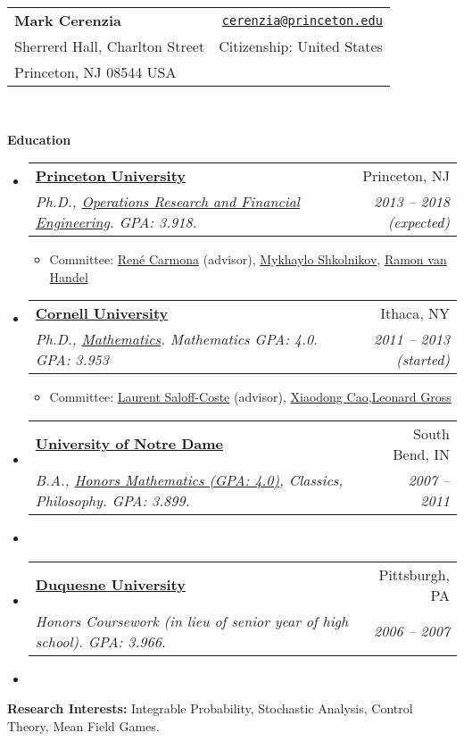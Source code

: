 \documentclass[letterpaper,11pt]{article}
\makeatletter
\newcommand{\resitem}[1]{\item #1 \vspace{-2pt}}
\newcommand{\resheading}[1]{{\large {\textbf{#1 \vphantom{p\^{E}}}}}}
\newenvironment{widetable}[1]
	       {\begin{tabular*}{#1}[t]{l@{\extracolsep{\fill}}r}}
	       {\end{tabular*}}
\newcommand{\ressubheading}[4]{
  \begin{widetable}{\textwidth - 28pt}
		\textbf{#1} & #2 \\
		\textit{#3} & \textit{#4} \\
  \end{widetable}
  \vspace{-12pt}}
\makeatother
\begin{document}
  \begin{widetable}{\textwidth}
    \textbf{\Large Mark Cerenzia}  & \href{mailto: cerenzia@princeton.edu}{\texttt{cerenzia@princeton.edu}} \\
    Sherrerd Hall, Charlton Street & Citizenship: United States \\
    Princeton, NJ 08544 USA
  \end{widetable}
\\

\vspace{0.1in}


\resheading{Education}
\begin{itemize}[noitemsep,nolistsep,label={}]
\item
	\ressubheading{\href{http://www.princeton.edu/}{Princeton University}}
		      {Princeton, NJ}
		      {Ph.D., \href{http://orfe.princeton.edu}{Operations Research and Financial Engineering}. \emph{GPA: 3.918.}}{2013 -- 2018 (expected)}
	              \begin{itemize}
		        \resitem{Committee: \href{https://www.princeton.edu/~rcarmona/}{Ren\'{e} Carmona} (advisor), \href{http://www.princeton.edu/~mykhaylo/}{Mykhaylo Shkolnikov}, \href{http://www.princeton.edu/~rvan/}{Ramon van Handel}}
	              \end{itemize}
\item
	\ressubheading{\href{http://www.cornell.edu}{Cornell University}}
		      {Ithaca, NY}
		      {Ph.D., \href{http://www.math.cornell.edu}{Mathematics}. \emph{Mathematics GPA: 4.0. GPA: 3.953}}{2011 -- 2013 (started)}
	              \begin{itemize}
		        \resitem{Committee: \href{http://www.math.cornell.edu/~lsc/lau.html}{Laurent Saloff-Coste} (advisor), \href{http://www.math.cornell.edu/~cao/}{Xiaodong Cao},\href{https://www.math.cornell.edu/m/People/bynetid/lg35}{Leonard Gross}}
	              \end{itemize}

\item
	\ressubheading{\href{http://www.nd.edu}{University of Notre Dame}}
		      {South Bend, IN}
		      {B.A., \href{http://math.nd.edu/undergraduate-program/}{Honors Mathematics (GPA: 4.0)}, Classics, Philosophy. \emph{GPA: 3.899.}}
		      {2007 -- 2011}
	\item
	\item
		\ressubheading{\href{http://www.duq.edu}{Duquesne University}}
		      {Pittsburgh, PA}
		      {Honors Coursework (in lieu of senior year of high school). \emph{GPA: 3.966.}}
		      {2006 -- 2007}
		      \item
\end{itemize}
\resheading{Research Interests:}Integrable Probability, Stochastic Analysis, Control Theory, Mean Field Games.
\end{document}
